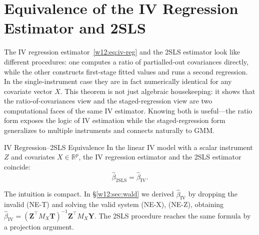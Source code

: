 \documentclass[master.tex]{subfiles}
\begin{document}
\section{Equivalence of the IV Regression Estimator and 2SLS}
\label{w12:sec:equiv}

The IV regression estimator~\eqref{w12:eq:iv-reg} and the 2SLS
estimator look like different procedures: one computes a ratio of
partialled-out covariances directly, while the other constructs
first-stage fitted values and runs a second regression.  In the
single-instrument case they are in fact numerically identical for any
covariate vector $X$.  This theorem is not just algebraic
housekeeping: it shows that the ratio-of-covariances view and the
staged-regression view are two computational faces of the same IV
estimator.  Knowing both is useful---the ratio form exposes the logic
of IV estimation while the staged-regression form generalizes to
multiple instruments and connects naturally to GMM.

\begin{thm}{IV Regression--2SLS Equivalence}
\label{w12:thm:equiv}
In the linear IV model with a scalar instrument $Z$ and covariates
$X \in \mathbb{R}^p$, the IV regression estimator and the 2SLS
estimator coincide:
\[
  \hat\beta_{\mathrm{2SLS}} = \hat\beta_{\mathrm{IV}}.
\]
\end{thm}

The intuition is compact.  In §\ref{w12:sec:wald} we derived
$\hat\beta_{\mathrm{IV}}$ by dropping the invalid (NE-T) and solving
the valid system (NE-X), (NE-Z), obtaining
$\hat\beta_{\mathrm{IV}} = (\mathbf{Z}^\top M_X \mathbf{T})^{-1}
\mathbf{Z}^\top M_X \mathbf{Y}$.
The 2SLS procedure reaches the same formula by a projection
argument.
\end{document}
